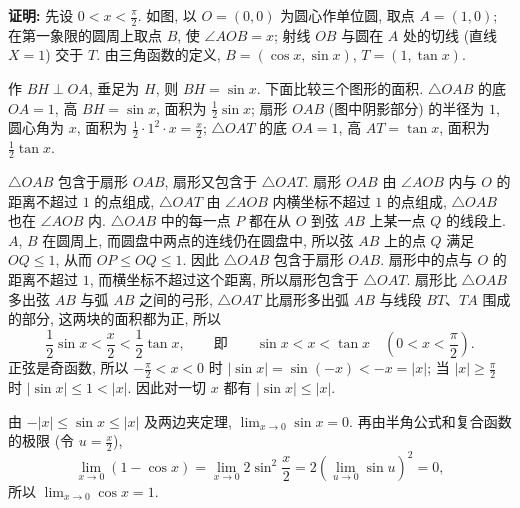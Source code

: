 \documentclass[UTF8,openany]{ctexbook}
\theoremstyle{chinesetextbook}
\newenvironment{cnproof}{\par\indent\textbf{证明:} \ignorespaces}{\par}
\begin{document}
\begin{cnproof}
先设 $\displaystyle0<x<\frac\pi2$. 如图, 以 $O=(0,0)$ 为圆心作单位圆, 取点 $A=(1,0)$; 在第一象限的圆周上取点 $B$, 使 $\angle AOB=x$; 射线 $OB$ 与圆在 $A$ 处的切线 (直线 $X=1$) 交于 $T$. 由三角函数的定义, $B=(\cos x,\sin x)$, $T=(1,\tan x)$.
\begin{center}
\end{center}
作 $BH\perp OA$, 垂足为 $H$, 则 $BH=\sin x$. 下面比较三个图形的面积. $\triangle OAB$ 的底 $OA=1$, 高 $BH=\sin x$, 面积为 $\displaystyle\frac12\sin x$; 扇形 $OAB$ (图中阴影部分) 的半径为 $1$, 圆心角为 $x$, 面积为 $\displaystyle\frac12\cdot1^2\cdot x=\frac x2$; $\triangle OAT$ 的底 $OA=1$, 高 $AT=\tan x$, 面积为 $\displaystyle\frac12\tan x$.

$\triangle OAB$ 包含于扇形 $OAB$, 扇形又包含于 $\triangle OAT$. 扇形 $OAB$ 由 $\angle AOB$ 内与 $O$ 的距离不超过 $1$ 的点组成, $\triangle OAT$ 由 $\angle AOB$ 内横坐标不超过 $1$ 的点组成, $\triangle OAB$ 也在 $\angle AOB$ 内. $\triangle OAB$ 中的每一点 $P$ 都在从 $O$ 到弦 $AB$ 上某一点 $Q$ 的线段上. $A$, $B$ 在圆周上, 而圆盘中两点的连线仍在圆盘中, 所以弦 $AB$ 上的点 $Q$ 满足 $OQ\le1$, 从而 $OP\le OQ\le1$. 因此 $\triangle OAB$ 包含于扇形 $OAB$. 扇形中的点与 $O$ 的距离不超过 $1$, 而横坐标不超过这个距离, 所以扇形包含于 $\triangle OAT$. 扇形比 $\triangle OAB$ 多出弦 $AB$ 与弧 $AB$ 之间的弓形, $\triangle OAT$ 比扇形多出弧 $AB$ 与线段 $BT$、$TA$ 围成的部分, 这两块的面积都为正, 所以
\[
\frac12\sin x<\frac x2<\frac12\tan x,\qquad\text{即}\qquad\sin x<x<\tan x\quad\left(0<x<\frac\pi2\right).
\]
正弦是奇函数, 所以 $\displaystyle-\frac\pi2<x<0$ 时 $|\sin x|=\sin(-x)<-x=|x|$; 当 $\displaystyle|x|\ge\frac\pi2$ 时 $|\sin x|\le1<|x|$. 因此对一切 $x$ 都有 $|\sin x|\le|x|$.

由 $-|x|\le\sin x\le|x|$ 及两边夹定理, $\displaystyle\lim_{x\to0}\sin x=0$. 再由半角公式和复合函数的极限 (令 $\displaystyle u=\frac x2$),
\[
\lim_{x\to0}(1-\cos x)=\lim_{x\to0}2\sin^2\frac x2=2\left(\lim_{u\to0}\sin u\right)^2=0,
\]
所以 $\displaystyle\lim_{x\to0}\cos x=1$.
\end{cnproof}
\end{document}
